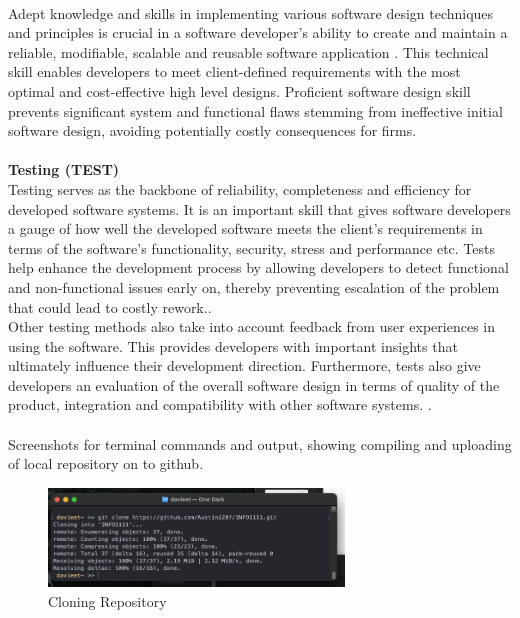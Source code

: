 \documentclass[a4paper, 11pt]{report}
\begin{document}
\\[1em]
 Adept knowledge and skills in implementing various software design techniques and principles is crucial in a software developer’s ability to create and maintain a reliable, modifiable, scalable and reusable software application \cite{SWDN1}\cite{SWDN2}. This technical skill enables developers to meet client-defined requirements with the most optimal and cost-effective high level designs. Proficient software design skill prevents significant system and functional flaws stemming from ineffective initial software design, avoiding potentially costly consequences for firms.\cite{SWDN1}
\\[1em]
\\[1em]
\noindent \textbf {Testing (TEST)}
\\[1em]
Testing serves as the backbone of reliability, completeness and efficiency for developed software systems. It is an important skill that gives software developers a gauge of how well the developed software meets the client’s requirements in terms of the software’s functionality, security, stress and performance etc.\cite{TEST1}  Tests help enhance the development process by allowing developers to detect functional and non-functional issues early on, thereby preventing escalation of the problem that could lead to costly rework.\cite{TEST2}\cite{TEST3}.
\\[1em]
Other testing methods also take into account feedback from user experiences in using the software. This provides developers with important insights that ultimately influence their development direction. Furthermore, tests also give developers an evaluation of the overall software design in terms of quality of the product, integration and compatibility with other software systems.
\cite{TEST2}.
\\[1em]
\\[1em]
Screenshots for terminal commands and output, showing compiling and uploading of local repository on to github. 

\begin{figure}[H]
    \centering
    \includegraphics[width=0.7\textwidth]{proof1}
    \caption{Cloning Repository}
\end{figure}
\end{document}
